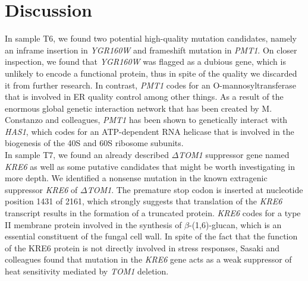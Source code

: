 \documentclass[10pt,a4paper]{article}
\begin{document}
\section*{\large Discussion}

In sample T6, we found two potential high-quality mutation candidates, namely an inframe insertion in \textit{YGR160W} and frameshift mutation in \textit{PMT1}. On closer inspection, we found that \textit{YGR160W} was flagged as a dubious gene, which is unlikely to encode a functional protein, thus in spite of the quality we discarded it from further research. In contrast, \textit{PMT1} codes for an O-mannosyltransferase that is involved in ER quality control among other things\cite{strahl_pmti_1993,goder_protein_2011}. As a result of the enormous global genetic interaction network that has been created by M. Constanzo and colleagues, \textit{PMT1} has been shown to genetically interact with \textit{HAS1}, which codes for an ATP-dependent RNA helicase that is involved in the biogenesis of the 40S and 60S ribosome subunits\cite{costanzo_global_2016,dembowski_has1_2013}.\\ 

\noindent In sample T7, we found an already described\textit{ $\Delta$TOM1} suppressor gene named \textit{KRE6} as well as some putative candidates that might be worth investigating in more depth. We identified a nonsense mutation in the known extragenic suppressor \textit{KRE6} of \textit{$\Delta$TOM1}. The premature stop codon is inserted at nucleotide position 1431 of 2161, which strongly suggests that translation of the \textit{KRE6} transcript results in the formation of a truncated protein. \textit{KRE6} codes for a type II membrane protein involved in the synthesis of $\beta$-(1,6)-glucan, which is an essential constituent of the fungal cell wall\cite{kurita_kre6_2011,roemer_skn1_1993}. In spite of the fact that the function of the KRE6 protein is not directly involved in stress responses, Sasaki and colleagues found that mutation in the \textit{KRE6} gene acts as a weak suppressor of heat sensitivity mediated by \textit{TOM1} deletion\cite{sasaki_extragenic_2000}.\\
\end{document}
